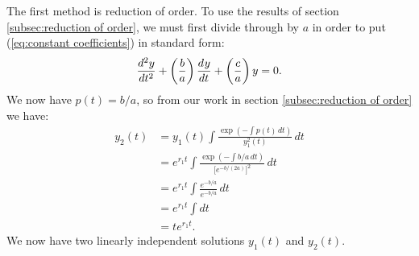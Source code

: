\documentclass{myart}
\newcommand{\eq}[1]{(\ref{eq:#1})}
\newcommand{\deriv}[3][]{\frac{d^{#1}#2}{d#3^{#1}}}
\begin{document}
The first method is reduction of order. To use the results of section
\ref{subsec:reduction of order}, we must first divide through by $a$
in order to put \eq{constant coefficients} in standard form:
\begin{equation*}
    \deriv[2]{y}{t}
  + \left(\frac{b}{a}\right) \deriv{y}{t}
  + \left(\vphantom{\frac{b}{a}}\frac{c}{a}\right)y
  = 0.
\end{equation*}
We now have $p(t) = b/a$, so from our work in section
\ref{subsec:reduction of order} we have:
\begin{align*}
  y_2(t) &= y_1(t) \int \frac{\exp\left(-\int p(t) \,dt\right)}
                             {y_1^2(t)} \,dt \\
         &= e^{r_1t} \int \frac{\exp\left(-\int b/a \,dt\right)}
                               {\big[e^{-b/(2a)}\big]^2} \,dt \\
         &= e^{r_1t} \int \frac{e^{-b/a}}{e^{-b/a}} \,dt \\
         &= e^{r_1t} \int dt \\
         &= te^{r_1t}.
\end{align*}
We now have two linearly independent solutions $y_1(t)$ and $y_2(t)$.
\end{document}
